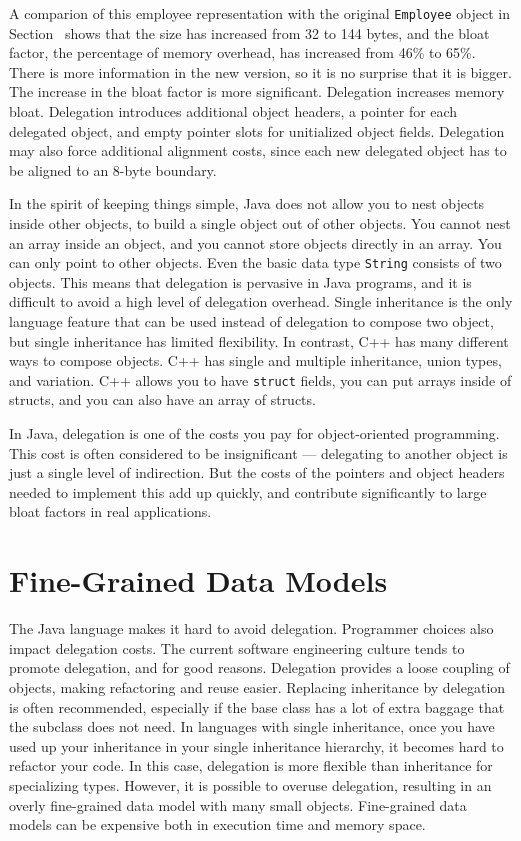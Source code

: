\documentclass{book}
\theoremstyle{definition}
\begin{document}
A comparion of this employee representation with the original \texttt{Employee} object in Section~\cite{CostOfObects} shows that the size has increased from 32 to 144 bytes, and the bloat factor, the percentage of memory overhead, has increased from 46\% to 65\%. There is more information in the new version, so it is no surprise that it is bigger. The increase in the bloat factor is more significant. Delegation increases memory bloat. Delegation introduces additional object headers, a pointer for each delegated object, and empty pointer slots for unitialized object fields. Delegation may also force additional alignment costs, since each new delegated object has to be aligned to an 8-byte boundary. 

In the spirit of keeping things simple, Java does not allow you to nest objects inside other objects, to build a single object out of other objects. You cannot nest an array inside an object, and you cannot store objects directly in an array.  You can only point to other objects. Even the basic data type \texttt{String} consists of two objects. This means that delegation is pervasive in Java programs, and it is difficult to avoid a high level of delegation overhead. Single inheritance is the only language feature that can be used instead of delegation to compose two object, but single inheritance has limited flexibility.  In contrast, C++ has many different ways to compose objects. C++ has single and multiple inheritance, union types, and variation. C++ allows you to have \texttt{struct} fields, you can put arrays inside of structs, and you can also have an array of structs.  

In Java, delegation is one of the costs you pay for object-oriented programming. This cost is often considered to be insignificant --- delegating to another object is just a single level of indirection. But the costs of the pointers and object headers needed to implement this add up quickly, and contribute significantly to large bloat factors in real applications.

\section{Fine-Grained Data Models}
\label{fine-grained-data-models}

The Java language makes it hard to avoid delegation. Programmer choices also impact delegation costs.  The current software engineering culture tends to promote delegation, and for good reasons. Delegation provides a loose coupling of objects, making refactoring and reuse easier. Replacing inheritance by delegation is often recommended, especially if the base class has a lot of extra baggage that the subclass does not need. In languages with single inheritance, once you have used up your inheritance in your single inheritance hierarchy, it becomes hard to refactor your code. In this case, delegation is more flexible than inheritance for specializing types. However, it is possible to overuse delegation, resulting in an overly fine-grained data model with many small objects. Fine-grained data models can be expensive both in execution time and memory space. 
\end{document}
